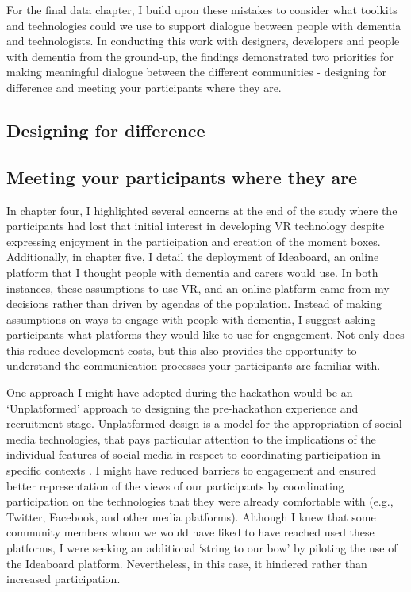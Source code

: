 For the final data chapter, I build upon these mistakes to consider what toolkits and technologies could we use to support dialogue between people with dementia and technologists. In conducting this work with designers, developers and people with dementia from the ground-up, the findings demonstrated two priorities for making meaningful dialogue between the different communities - designing for difference and meeting your participants where they are.

\subsection{Designing for difference}
\label{Discussion:Design4Difference}

\subsection{Meeting your participants where they are}
\label{Discussion:WhereTheyAre}
In chapter four, I highlighted several concerns at the end of the study where the participants had lost that initial interest in developing VR technology despite expressing enjoyment in the participation and creation of the moment boxes. Additionally, in chapter five, I detail the deployment of Ideaboard, an online platform that I thought people with dementia and carers would use. In both instances, these assumptions to use VR, and an online platform came from my decisions rather than driven by agendas of the population. Instead of making assumptions on ways to engage with people with dementia, I suggest asking participants what platforms they would like to use for engagement. Not only does this reduce development costs, but this also provides the opportunity to understand the communication processes your participants are familiar with. 

One approach I might have adopted during the hackathon would be an ‘Unplatformed’ approach to designing the pre-hackathon experience and recruitment stage. Unplatformed design is a model for the appropriation of social media technologies, that pays particular attention to the implications of the individual features of social media in respect to coordinating participation in specific contexts \citep{lambton-howard_unplatformed_2020}. I might have reduced barriers to engagement and ensured better representation of the views of our participants by coordinating participation on the technologies that they were already comfortable with (e.g., Twitter, Facebook, and other media platforms). Although I knew that some community members whom we would have liked to have reached used these platforms, I were seeking an additional ‘string to our bow’ by piloting the use of the Ideaboard platform. Nevertheless, in this case, it hindered rather than increased participation. 

